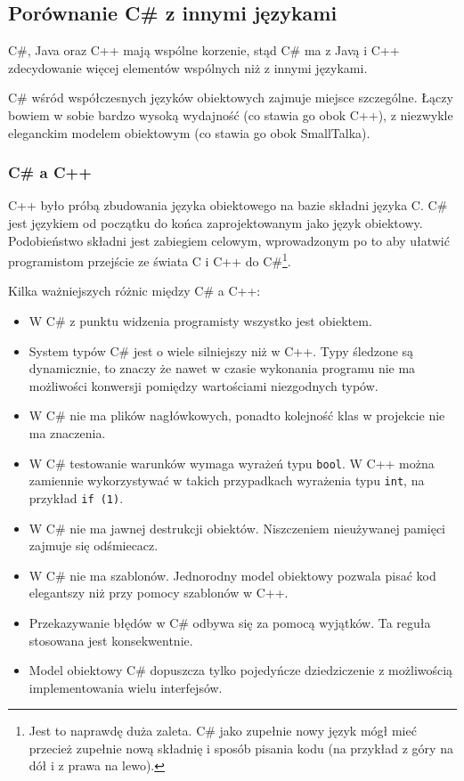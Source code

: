 ﻿\subsection{Porównanie C\# z innymi językami}

C\#, Java oraz C++ mają wspólne korzenie, stąd C\# ma z Javą i C++ zdecydowanie więcej elementów wspólnych
niż z innymi językami. 

C\# wśród współczesnych języków obiektowych zajmuje miejsce szczególne. Łączy bowiem w sobie 
bardzo wysoką wydajność (co stawia go obok C++), z niezwykle eleganckim modelem obiektowym (co stawia go obok
SmallTalka). 

\subsubsection{C\# a C++}

C++ było próbą zbudowania języka obiektowego na bazie składni języka C. C\# jest językiem
od początku do końca zaprojektowanym jako język obiektowy. Podobieństwo składni jest
zabiegiem celowym, wprowadzonym po to aby ułatwić programistom przejście ze świata 
C i C++ do C\#\footnote{Jest to naprawdę duża zaleta. C\# jako zupełnie nowy język mógł mieć
przecież zupełnie nową składnię i sposób pisania kodu (na przykład z góry na dół i z prawa na lewo).}.

Kilka ważniejszych różnic między C\# a C++:

\begin{itemize}
\item W C\# z punktu widzenia programisty wszystko jest obiektem. 
\item System typów C\# jest o wiele silniejszy niż w C++. Typy śledzone są dynamicznie, to znaczy
że nawet w czasie wykonania programu nie ma możliwości konwersji pomiędzy wartościami niezgodnych typów.
\item W C\# nie ma plików nagłówkowych, ponadto kolejność klas w projekcie nie ma znaczenia.
\item W C\# testowanie warunków wymaga wyrażeń typu {\tt bool}. W C++ można zamiennie wykorzystywać
w takich przypadkach wyrażenia typu {\tt int}, na przykład {\tt if (1)}.
\item W C\# nie ma jawnej destrukcji obiektów. Niszczeniem nieużywanej pamięci zajmuje się odśmiecacz.
\item W C\# nie ma szablonów. Jednorodny model obiektowy pozwala pisać kod elegantszy niż przy pomocy
szablonów w C++.
\item Przekazywanie błędów w C\# odbywa się za pomocą wyjątków. Ta reguła stosowana jest konsekwentnie.
\item Model obiektowy C\# dopuszcza tylko pojedyńcze dziedziczenie z możliwością implementowania wielu
interfejsów.

\end{itemize}

